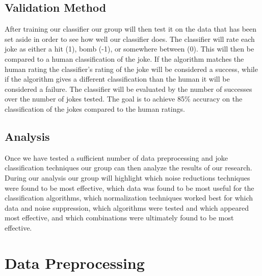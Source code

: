 \documentclass[onecolumn, draftclsnofoot,10pt, compsoc]{IEEEtran}
\begin{document}
\subsection{Validation Method}
After training our classifier our group will then test it on the data that has been set aside in order to see how well our classifier does. The classifier will rate each joke as either a hit (1), bomb (-1), or somewhere between (0). This will then be compared to a human classification of the joke. If the algorithm matches the human rating the classifier's rating of the joke will be considered a success, while if the algorithm gives a different classification than the human it will be considered a failure. The classifier will be evaluated by the number of successes over the number of jokes tested. The goal is to achieve 85\% accuracy on the classification of the jokes compared to the human ratings.
\subsection{Analysis}
Once we have tested a sufficient number of data preprocessing and joke classification techniques our group can then analyze the results of our research. During our analysis our group will highlight which noise reductions techniques were found to be most effective, which data was found to be most useful for the classification algorithms, which normalization techniques worked best for which data and noise suppression, which algorithms were tested and which appeared most effective, and which combinations were ultimately found to be most effective.

\section{Data Preprocessing}
\end{document}
